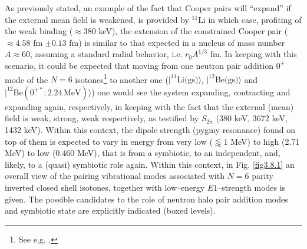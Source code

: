   As previously stated, an example of the fact that Cooper pairs will ``expand'' if the external mean field is weakened, is provided by $^{11}$Li in which case, profiting of the weak binding ($\approx 380$ keV), the extension of the constrained Cooper  pair ($\approx 4.58 $ fm $\pm 0.13$ fm)   is similar to that expected in a nucleus of mass number $A\approx 60$, assuming a standard radial behavior, i.e. $r_0 A^{1/3}$ fm. In keeping with this scenario, it could be expected that moving from one neutron pair addition $0^+$ mode of the $N=6$ isotones\footnote{See e.g. \cite{Gori:04}.} to another one ($|^{11}\text{Li(gs)}\rangle$, $|^{12}\text{Be(gs)}\rangle$ and $|^{12}\text{Be}(0^{+*};2.24\,\text{MeV})\rangle$) one would see the system expanding, contracting and expanding again, respectively, in keeping with the fact that the external (mean) field is weak, strong, weak respectively, as testified by $S_{2n}$ (380 keV, 3672 keV, 1432 keV). Within this context,  the dipole  strength (pygmy resonance) found on top of them is expected to vary in  energy from very low ($\lessapprox1$ MeV) to high (2.71 MeV) to low (0.460 MeV), that is from a symbiotic, to an independent, and, likely, to a (quasi) symbiotic role again.
Within this context, in Fig. \ref{fig3.8.1} an overall view of the pairing vibrational modes associated with $N=6$ parity inverted closed shell isotones, together with low--energy $E1$--strength modes is given. The possible candidates to the role of neutron halo pair addition modes and symbiotic state are explicitly indicated (boxed levels).
